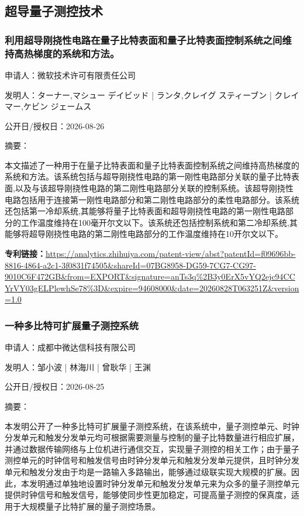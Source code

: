 \documentclass[12pt,a4paper]{ctexart}
\begin{document}
\subsection{ 超导量子测控技术 }

\subsubsection{ 利用超导刚挠性电路在量子比特表面和量子比特表面控制系统之间维持高热梯度的系统和方法。 }

申请人：微软技术许可有限责任公司

发明人：ターナー,マシュー デイビッド | ランタ,クレイグ スティーブン | クレイマー,ケビン ジェームス

公开日/授权日：2026-08-26

摘要：

本文描述了一种用于在量子比特表面和量子比特表面控制系统之间维持高热梯度的系统和方法。该系统包括与超导刚挠性电路的第一刚性电路部分关联的量子比特表面,以及与该超导刚挠性电路的第二刚性电路部分关联的控制系统。该超导刚挠性电路包括用于连接第一刚性电路部分和第二刚性电路部分的柔性电路部分。该系统还包括第一冷却系统,其能够将量子比特表面和超导刚挠性电路的第一刚性电路部分的工作温度维持在100毫开尔文以下。该系统还包括控制系统和第二冷却系统,其能够将超导刚挠性电路的第二刚性电路部分的工作温度维持在10开尔文以下。

\noindent\textbf{专利链接：}\url{https://analytics.zhihuiya.com/patent-view/abst?patentId=f09696bb-8816-4864-a2c1-3f0831f74505&shareId=07BG8958-DG59-7CG7-CG97-9010C6F472GB&from=EXPORT&signature=anTs3q%2B3y0ErX5vYQ2ejc94CCYrVY03gELPlewhSe78%3D&expire=94608000&date=20260828T063251Z&version=1.0}

\subsubsection{ 一种多比特可扩展量子测控系统 }

申请人：成都中微达信科技有限公司

发明人：邹小波 | 林海川 | 曾耿华 | 王渊

公开日/授权日：2026-08-25

摘要：

本发明公开了一种多比特可扩展量子测控系统，在该系统中，量子测控单元、时钟分发单元和触发分发单元均可根据需要测量与控制的量子比特数量进行相应扩展，并通过数据传输网络与上位机进行通信交互，实现量子测控的相关工作；由于量子测控单元的时钟信号和触发信号由时钟分发单元和触发分发单元提供，且时钟分发单元和触发分发由于均是一路输入多路输出，能够通过级联实现大规模的扩展。因此，本发明通过单独地设置时钟分发单元和触发分发单元来为众多的量子测控单元提供时钟信号和触发信号，能够使同步性更加稳定，可提高量子测控的保真度，适用于大规模量子比特扩展的量子测控场景。
\end{document}
